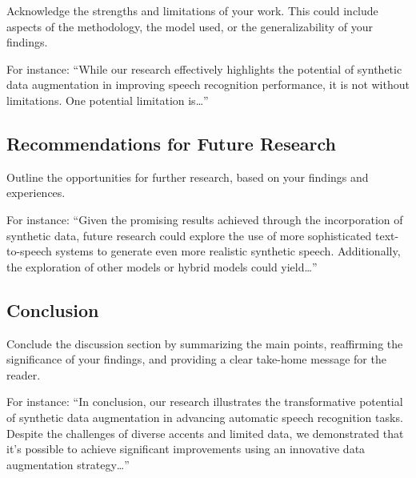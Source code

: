 \documentclass[
]{article}
\begin{document}
Acknowledge the strengths and limitations of your work. This could
include aspects of the methodology, the model used, or the
generalizability of your findings.

For instance: ``While our research effectively highlights the potential
of synthetic data augmentation in improving speech recognition
performance, it is not without limitations. One potential limitation
is\ldots{}''

\hypertarget{recommendations-for-future-research}{%
\subsection{Recommendations for Future
Research}\label{recommendations-for-future-research}}

Outline the opportunities for further research, based on your findings
and experiences.

For instance: ``Given the promising results achieved through the
incorporation of synthetic data, future research could explore the use
of more sophisticated text-to-speech systems to generate even more
realistic synthetic speech. Additionally, the exploration of other
models or hybrid models could yield\ldots{}''

\hypertarget{conclusion}{%
\subsection{Conclusion}\label{conclusion}}

Conclude the discussion section by summarizing the main points,
reaffirming the significance of your findings, and providing a clear
take-home message for the reader.

For instance: ``In conclusion, our research illustrates the
transformative potential of synthetic data augmentation in advancing
automatic speech recognition tasks. Despite the challenges of diverse
accents and limited data, we demonstrated that it's possible to achieve
significant improvements using an innovative data augmentation
strategy\ldots{}''
\end{document}
